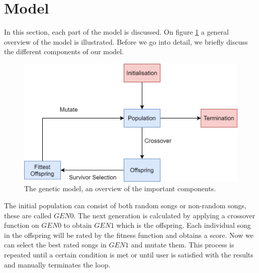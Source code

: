 \section{Model}
In this section, each part of the model is discussed. On figure \ref{fig:GA_MODEL} a general overview of the model is illustrated. Before we go into detail, we briefly discuss the different components of our model.
\begin{figure}
    \includegraphics[width=\linewidth]{figures/GA_structure.png}
    \caption{The genetic model, an overview of the important components.}
    \label{fig:GA_MODEL}
\end{figure}

The initial population can consist of both random songs or non-random songs, these are called $GEN0$. The next generation is calculated by applying a crossover function on $GEN0$ to obtain $GEN1$ which is the offspring. Each individual song in the offspring will be rated by the fitness function and obtains a score. Now we can select the best rated songs in $GEN1$ and mutate them. This process is repeated until a certain condition is met or until user is satisfied with the results and manually terminates the loop.




